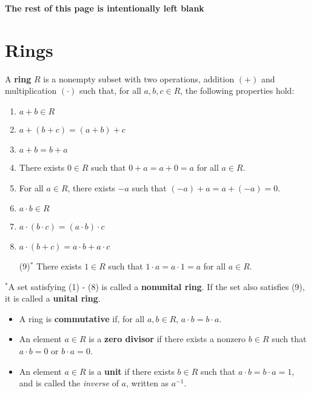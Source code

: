 \documentclass [12pt] {article}
\newenvironment{definition}[1]{\begin{tcolorbox}[title={Definition: #1},colback=blue!5!white,colframe=black!75!blue]}{\end{tcolorbox}}
\renewcommand{\it}[1]{\textit{{#1}}}
\renewcommand{\bf}[1]{\textbf{{#1}}}
\begin{document}
\begin{center}
    \vspace{5em}
    \bf{The rest of this page is intentionally left blank}
\end{center}

\newpage
\section{Rings}
\begin{definition}{Ring}
    A \bf{ring} $R$ is a nonempty subset with two operations, addition $(+)$ and multiplication
    $(\cdot)$ such that, for all $a, b, c \in R$, the following properties hold:
    \begin{enumerate}[label=(\arabic*)]
        \item $a + b \in R$ 
        \item $a + (b + c) = (a + b) + c$
        \item $a + b = b + a$ 
        \item There exists $0 \in R$ such that $0 + a = a + 0 = a$ for all $a \in R$.
        \item For all $a \in R$, there exists $-a$ such that $(-a) + a = a + (-a) = 0$.
        \item $a \cdot b \in R$
        \item $a \cdot (b \cdot c) = (a \cdot b) \cdot c$
        \item $a \cdot (b + c) = a \cdot b + a \cdot c$
        \item[(9)$^*$] There exists $1 \in R$ such that $1 \cdot a = a \cdot 1 = a$ for all $a \in R$.
    \end{enumerate}
    $^*$A set satisfying (1) - (8) is called a \bf{nonunital ring}. If the set also satisfies (9), 
    it is called a \bf{unital ring}.

    \vspace{-0.5em}
    \begin{itemize}[label=$\to$, leftmargin=*, itemsep=0em]
        \item A ring is \bf{commutative} if, for all $a, b \in R$, $a \cdot b = b \cdot a$.
        \item An element $a \in R$ is a \bf{zero divisor} if there exists a nonzero $b \in R$ such 
            that $a \cdot b = 0$ or $b \cdot a = 0$.
        \item An element $a \in R$ is a \bf{unit} if there exists $b \in R$ such that 
            $a \cdot b = b \cdot a = 1$, and is called the \it{inverse} of $a$, written as $a^{-1}$.
    \end{itemize}
\end{definition}
\end{document}
